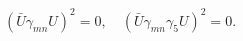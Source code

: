 \begin{equation}\label{25}
(\bar U\gamma_{mn}U)^2=0,\quad(\bar U\gamma_{mn}\gamma_5U)^2=0.
\end{equation}

